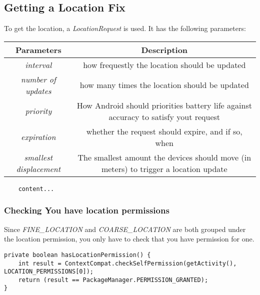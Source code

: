 \documentclass[]{article}
\renewcommand{\it}[1]{\textit{#1}}
\begin{document}
\subsection{Getting a Location Fix}
To get the location, a \it{LocationRequest} is used.  It has the following parameters:
\begin{center}
	\begin{tabular}{| c | c |} 
		\hline
		Parameters  & Description  \\ [0.5ex] 
		\hline 
		\it{interval} & how frequestly the location should be updated   \\ [1ex]
		\it{number of updates} & how many times the location should be updated   \\ [1ex]
		\it{priority} & How Android should priorities battery life against accuracy to satisfy yout request   \\ [1ex]
		\it{expiration} & whether the request should expire, and if so, when  \\  [1ex] 		
		\it{smallest displacement} & The smallest amount the devices should move (in meters) to trigger a location update  \\  [1ex] 
		\hline
	\end{tabular}
\end{center}
\begin{lstlisting}
	content...
\end{lstlisting}

\subsubsection{Checking You have location permissions}
Since  \it{FINE\_LOCATION} and \it{COARSE\_LOCATION} are both grouped under the location permission, you only have to check that you have permission for one.
\begin{lstlisting}
private boolean hasLocationPermission() {
	int result = ContextCompat.checkSelfPermission(getActivity(), LOCATION_PERMISSIONS[0]);
	return (result == PackageManager.PERMISSION_GRANTED);
}
\end{lstlisting}
\end{document}
